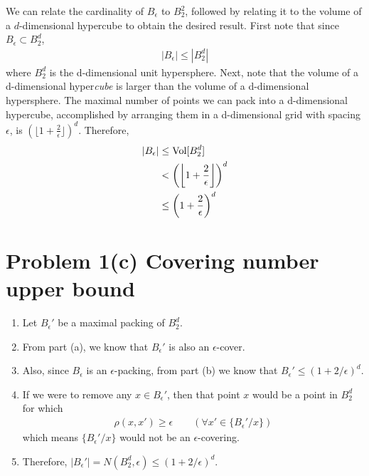 \documentclass[11pt]{article}
\newcommand{\1}{\mathbb{I}} %
\begin{document}
We can relate the cardinality of $B_{\epsilon}$ to $B_2^2$, followed by relating it to the volume of a $d$-dimensional hypercube to obtain the desired result. First note that since $B_{\epsilon} \subset B_2^d$, 
\begin{align}
	|B_{\epsilon} | \leq |B_2^d|
\end{align}
where $B_2^d$ is the d-dimensional unit hypersphere. Next, note that the volume of a d-dimensional hyper\textit{cube} is larger than the volume of a d-dimensional hypersphere. The maximal number of points we can pack into a d-dimensional hypercube, accomplished by arranging them in a d-dimensional grid with spacing $\epsilon$, is $(  \lfloor 1 + \frac{2}{\epsilon} \rfloor )^d$. Therefore, 
\begin{align}
	|B_\epsilon| 
		&\leq \text{Vol}[B_2^d] \\
		&< \left(  \left\lfloor   1 + \frac{2}{\epsilon  } \right\rfloor  \right)^d \\
		&\leq  \left(     1 + \frac{2}{\epsilon  }  \right)^d
\end{align}


\clearpage
\section*{Problem 1(c) Covering number upper bound}

\begin{enumerate}
	\item Let $B_{\epsilon}'$ be a maximal packing of $B_2^d$. 
	
	\item From part (a), we know that $B_{\epsilon}'$ is also an $\epsilon$-cover. 
	
	\item Also, since $B_{\epsilon}$ is an $\epsilon$-packing, from part (b) we know that $B_{\epsilon}' \leq (1 + 2/\epsilon)^d$. 
	
	\item If we were to remove any $x \in B_{\epsilon}'$, then that point $x$ would be a point in $B_2^d$ for which 
	\begin{align}
		\rho(x, x') \geq \epsilon \qquad (\forall x' \in \{ B_{\epsilon}' / x \})
	\end{align}
	which means $\{ B_{\epsilon}' / x \}$ would not be an $\epsilon$-covering. 
	
	\item Therefore, $|B_{\epsilon}'| = N(B_2^d, \epsilon) \leq (1 + 2/\epsilon)^d$. 
\end{enumerate}
\end{document}
